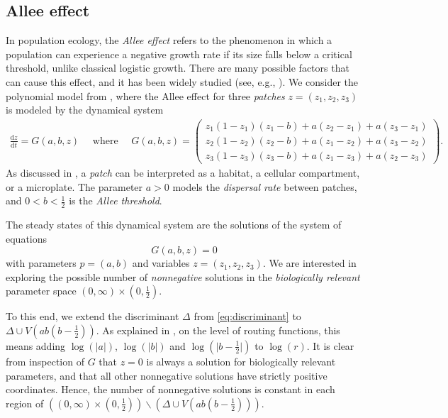 \documentclass[11pt]{article}
\numberwithin{equation}{section}
\theoremstyle{plain}
\theoremstyle{definition}
\theoremstyle{remark}
\begin{document}
\subsection{Allee effect}\label{subsec:allee}
In population ecology, the \emph{Allee effect} refers to the phenomenon in which a population can experience a negative growth rate if its size falls below a critical threshold, unlike classical logistic growth. There are many possible factors that can cause this effect, and it has been widely studied (see, e.g., \cite{berec2007multiple}). We consider the polynomial model from \cite{alleethreepopulations}, where the Allee effect for three \emph{patches} $z=(z_1,z_2,z_3)$ is modeled by the dynamical system 
\begin{align*}
\frac{\mathrm d z}{\mathrm d t} = G(a,b,z)\quad \text{ where }\quad  G(a,b,z) = \begin{pmatrix}
    z_1(1-z_1)(z_1-b)+a(z_2-z_1) + a(z_3 - z_1)\\[0.25em]
    z_2(1-z_2)(z_2-b)+a(z_1-z_2) + a(z_3 - z_2)\\[0.25em]
    z_3(1-z_3)(z_3-b)+a(z_1-z_3) + a(z_2 - z_3)\end{pmatrix}.
\end{align*}
As discussed in \cite{alleethreepopulations}, a \emph{patch} can be interpreted as a habitat, a cellular compartment,
or a microplate. The parameter $a > 0$ models the \emph{dispersal rate} between patches, and $0<b < \frac{1}{2}$ is the \emph{Allee
threshold}.

The steady states of this dynamical system are the solutions of the system of equations 
$$G(a,b,z)  = 0$$
with parameters $p=(a,b)$ and variables $z=(z_1,z_2,z_3)$. We are interested in exploring the possible number of \emph{nonnegative} solutions in the \emph{biologically relevant} parameter space $(0,\infty)\times (0,\frac{1}{2})$. 

To this end, we extend the discriminant $\Delta$ from \eqref{eq:discriminant} to $\Delta\cup V(ab(b-\frac{1}{2}))$. As explained in ,
on the level of routing functions, this means adding $\log(\vert a\vert)$,  $\log(\vert b\vert)$ and $\log(\vert b-\frac{1}{2}\vert)$ to $\log(r)$. It is clear from inspection of $G$ that $z=0$ is always a solution for biologically relevant parameters, and that all other nonnegative solutions have strictly positive coordinates. Hence, the number of nonnegative solutions is constant in each region of $((0,\infty)\times (0,\frac{1}{2}))\smallsetminus (\Delta\cup V(ab(b-\frac{1}{2})))$.
\end{document}
